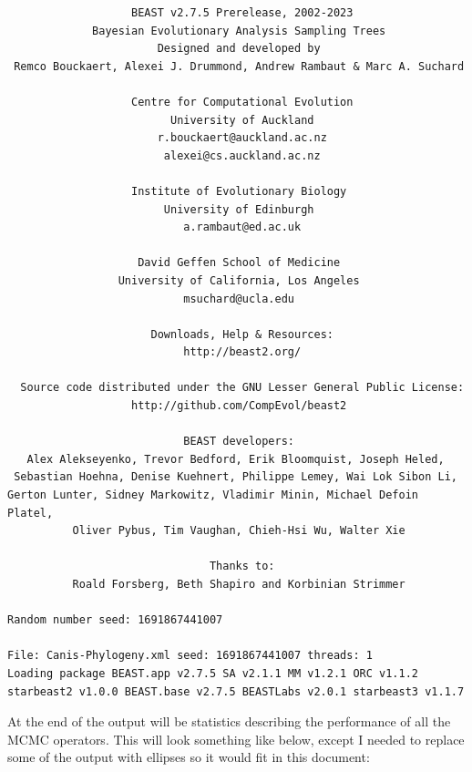 \documentclass[12pt]{article}
\begin{document}
\begin{verbatim}                   BEAST v2.7.5 Prerelease, 2002-2023
             Bayesian Evolutionary Analysis Sampling Trees
                       Designed and developed by
 Remco Bouckaert, Alexei J. Drummond, Andrew Rambaut & Marc A. Suchard
                                    
                   Centre for Computational Evolution
                         University of Auckland
                       r.bouckaert@auckland.ac.nz
                        alexei@cs.auckland.ac.nz
                                    
                   Institute of Evolutionary Biology
                        University of Edinburgh
                           a.rambaut@ed.ac.uk
                                    
                    David Geffen School of Medicine
                 University of California, Los Angeles
                           msuchard@ucla.edu
                                    
                      Downloads, Help & Resources:
                           http://beast2.org/
                                    
  Source code distributed under the GNU Lesser General Public License:
                   http://github.com/CompEvol/beast2
                                    
                           BEAST developers:
   Alex Alekseyenko, Trevor Bedford, Erik Bloomquist, Joseph Heled, 
 Sebastian Hoehna, Denise Kuehnert, Philippe Lemey, Wai Lok Sibon Li, 
Gerton Lunter, Sidney Markowitz, Vladimir Minin, Michael Defoin Platel, 
          Oliver Pybus, Tim Vaughan, Chieh-Hsi Wu, Walter Xie
                                    
                               Thanks to:
          Roald Forsberg, Beth Shapiro and Korbinian Strimmer

Random number seed: 1691867441007

File: Canis-Phylogeny.xml seed: 1691867441007 threads: 1
Loading package BEAST.app v2.7.5 SA v2.1.1 MM v1.2.1 ORC v1.1.2
starbeast2 v1.0.0 BEAST.base v2.7.5 BEASTLabs v2.0.1 starbeast3 v1.1.7\end{verbatim}

At the end of the output will be statistics describing the performance of all the MCMC operators. This will look something like below, except I needed to replace some of the output with ellipses so it would fit in this document:
\end{document}
